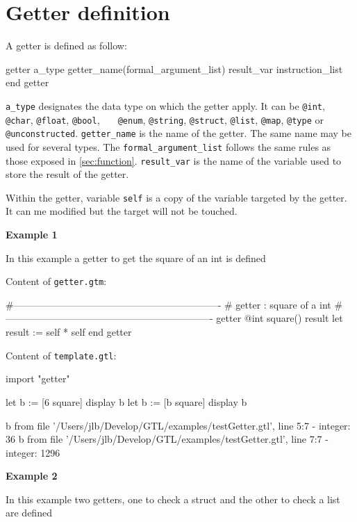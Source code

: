 \documentclass[10pt,openright,twosides]{report}
\newcommand{\gtltype}[1]{{\small\ttfamily #1}}
\newcommand{\gtlinline}[1]{\colorbox{light-blue}{\lstinline[language=gtl]{#1}}}
\newcommand{\examplen}[1]{\vspace{.75em}\noindent\textbf{Example #1}\vspace{0em}}
\begin{document}
\section{Getter definition}
\label{sec:getter}

A getter is defined as follow:

\begin{gtl}
getter a_type getter_name(formal_argument_list) result_var
  instruction_list
end getter
\end{gtl}

\gtlinline{a_type} designates the data type on which the getter apply. It can be \gtlinline{@int},  \gtlinline{@char}, \gtlinline{@float}, \gtlinline{@bool}, \gtlinline{	@enum}, \gtlinline{@string}, \gtlinline{@struct}, \gtlinline{@list}, \gtlinline{@map}, \gtlinline{@type} or \gtlinline{@unconstructed}. \gtlinline{getter_name} is the name of the getter. The same name may be used for several types. The \gtlinline{formal_argument_list} follows the same rules as those exposed in \ref{sec:function}. \gtlinline{result_var} is the name of the variable used to store the result of the getter.

Within the getter, variable \gtlinline{self} is a copy of the variable targeted by the getter. It can me modified but the target will not be touched.

\examplen{1}

In this example a getter to get the square of an \gtltype{int} is defined

\noindent Content of \texttt{\footnotesize getter.gtm}:
\begin{gtl}
#----------------------------------------------------------------
# getter : square of a int
#----------------------------------------------------------------
getter @int square() result
  let result := self * self
end getter
\end{gtl}
\noindent Content of \texttt{\footnotesize template.gtl}:
\begin{gtl}
import "getter"

let b := [6 square]
display b
let b := [b square]
display b
\end{gtl}
\begin{console}
b from file '/Users/jlb/Develop/GTL/examples/testGetter.gtl', line 5:7
  - integer: 36
b from file '/Users/jlb/Develop/GTL/examples/testGetter.gtl', line 7:7
  - integer: 1296
\end{console}

\examplen{2}

In this example two getters, one to check a \gtltype{struct} and the other to check a \gtltype{list} are defined
\end{document}
